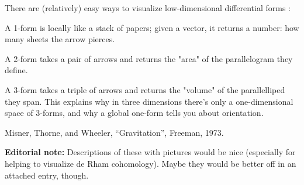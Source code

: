 \documentclass[12pt]{article}
\begin{document}
There are (relatively) easy ways to visualize low-dimensional differential forms \cite{mwt}:

A 1-form is locally like a stack of papers; given a vector, it returns a number: how many sheets the arrow pierces.

A 2-form takes a pair of arrows and returns the "area" of the parallelogram they define.

A 3-form takes a triple of arrows and returns the "volume" of the parallelliped they span. This explains why in three dimensions there's only a one-dimensional space of 3-forms, and why a global one-form tells you about orientation.


\begin{thebibliography}{99}
Misner, Thorne, and Wheeler, ``Gravitation'', Freeman, 1973.
\end{thebibliography}

\textbf{Editorial note:} Descriptions of these with pictures would be nice (especially for helping to visualize de Rham cohomology). Maybe they would be better off in an attached entry, though.

\end{document}
